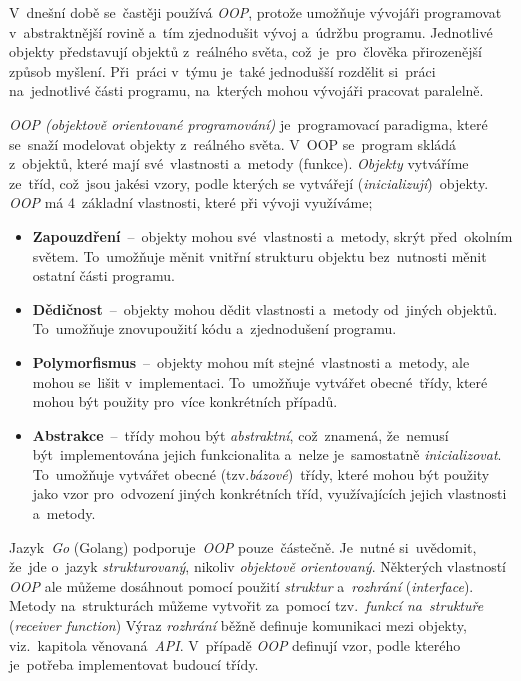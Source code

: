 \documentclass[11pt,a4paper]{report}
\begin{document}
            V~dnešní době se~častěji používá \emph{OOP}, protože umožňuje vývojáři programovat v~abstraktnější rovině a~tím zjednodušit vývoj a~údržbu programu. Jednotlivé objekty představují  objektů z~reálného světa, což~je~pro~člověka přirozenější způsob myšlení. Při~práci v~týmu je~také jednodušší rozdělit si~práci na~jednotlivé části programu, na~kterých mohou vývojáři pracovat paralelně.
            
            \emph{OOP (objektově orientované programování)} je~programovací paradigma, které se~snaží modelovat objekty z~reálného světa. V~OOP se~program skládá z~objektů, které mají své~vlastnosti a~metody (funkce). \emph{Objekty} vytváříme ze~tříd, což~jsou jakési vzory, podle kterých se vytvářejí (\emph{inicializují})~objekty. \emph{OOP} má 4~základní vlastnosti, které při vývoji využíváme; \cite{Keogh:OOP}
            \begin{itemize}
                \item \textbf{Zapouzdření}~--~objekty mohou své~vlastnosti a~metody, skrýt před~okolním světem. To~umožňuje měnit vnitřní strukturu objektu bez~nutnosti měnit ostatní části programu.
                \item \textbf{Dědičnost}~--~objekty mohou dědit vlastnosti a~metody od~jiných objektů. To~umožňuje znovupoužití kódu a~zjednodušení programu.
                \item \textbf{Polymorfismus}~--~objekty mohou mít stejné~vlastnosti a~metody, ale mohou se~lišit v~implementaci. To~umožňuje vytvářet obecné~třídy, které mohou být použity pro~více konkrétních případů.
                \item \textbf{Abstrakce}~--~třídy mohou být \emph{abstraktní}, což~znamená, že~nemusí být~implementována jejich funkcionalita a~nelze je~samostatně \emph{inicializovat}. To~umožňuje vytvářet obecné (tzv.\emph{bázové})~třídy, které mohou být použity jako vzor pro~odvození jiných konkrétních tříd, využívajících jejich vlastnosti a~metody.
            \end{itemize}

            Jazyk~\emph{Go} (Golang) podporuje~\emph{OOP} pouze~částečně. Je~nutné si~uvědomit, že~jde o~jazyk \emph{strukturovaný}, nikoliv \emph{objektově orientovaný}. Některých vlastností \emph{OOP} ale můžeme dosáhnout pomocí použití \emph{struktur} a~\emph{rozhrání} (\emph{interface}). Metody na~strukturách můžeme vytvořit za~pomocí tzv.~\emph{funkcí na~struktuře} (\emph{receiver function})
            Výraz \emph{rozhrání} běžně definuje komunikaci mezi objekty, viz.~kapitola věnovaná~\emph{API}. V~případě \emph{OOP} definují vzor, podle kterého je~potřeba implementovat budoucí třídy. \cite{go:OOP}
            
\end{document}
